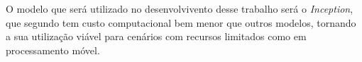 O modelo que será utilizado no desenvolvivento desse trabalho será o \textit{Inception}, que segundo  tem custo computacional bem menor que outros modelos, tornando a sua utilização viável para cenários com recursos limitados como em processamento móvel.














 
     
